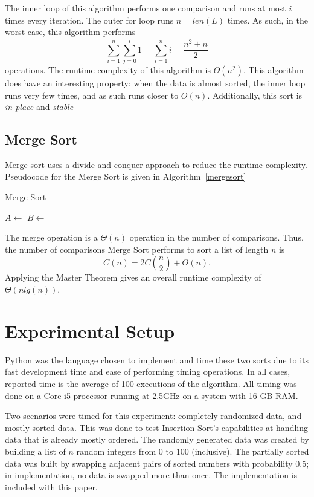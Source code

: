 \documentclass[10pt, letterpaper]{article}
\begin{document}
	The inner loop of this algorithm performs one comparison and runs at most $i$ times every iteration.  The outer for loop runs $n=len(L)$ times.  As such, in the worst case, this algorithm performs
	\[
	\sum_{i=1}^{n}\sum_{j=0}^{i}1=\sum_{i=1}^{n}i=\frac{n^2+n}{2}
	\]
	operations. The runtime complexity of this algorithm is $\Theta(n^2)$.  This algorithm does have an interesting property:  when the data is almost sorted, the inner loop runs very few times, and as such runs closer to $O(n)$.  Additionally, this sort is \emph{in place} and \emph{stable}
	\subsection{Merge Sort}
	Merge sort uses a divide and conquer approach to reduce the runtime complexity.  Pseudocode for the Merge Sort is given in Algorithm~\ref{mergesort}
	\begin{algorithm}
		\caption{Merge Sort}\label{mergesort}
	\begin{algorithmic}
	\EndIf
	\State $A\gets$
	\State $B\gets$\\
	\EndFunction
	\end{algorithmic}
	\end{algorithm}
	
	The merge operation is a $\Theta(n)$ operation in the number of comparisons.  Thus, the number of comparisons Merge Sort performs to sort a list of length $n$ is
	\[
	C(n) = 2C(\frac{n}{2}) + \Theta(n).
	\]
	Applying the Master Theorem gives an overall runtime complexity of $\Theta(nlg(n))$.
	\section{Experimental Setup}
	Python was the language chosen to implement and time these two sorts due to its fast development time and ease of performing timing operations.  In all cases, reported time is the average of 100 executions of the algorithm.  All timing was done on a Core i5 processor running at 2.5GHz on a system with 16 GB RAM.  
	
	Two scenarios were timed for this experiment:  completely randomized data, and mostly sorted data.  This was done to test Insertion Sort's capabilities at handling data that is already mostly ordered.  The randomly generated data was created by building a list of $n$ random integers from 0 to 100 (inclusive).  The partially sorted data was built by swapping adjacent pairs of sorted numbers with probability 0.5; in implementation, no data is swapped more than once.  The implementation is included with this paper.
\end{document}
